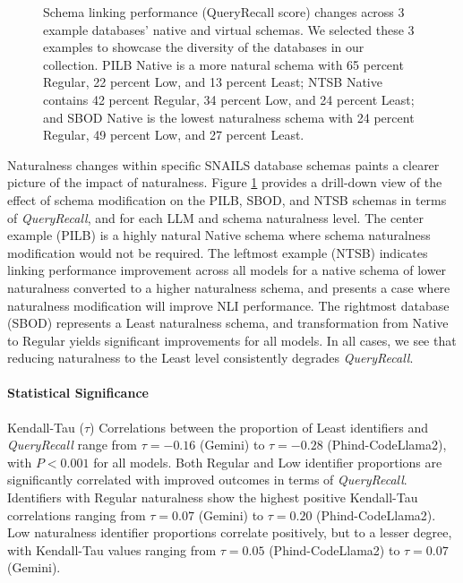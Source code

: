 \begin{figure}
\begin{subfigure}{\figwidthmod\linewidth}
  \end{subfigure}
  \caption{Schema linking performance (QueryRecall score) changes across 3 example databases' native and virtual schemas. We selected these 3 examples to showcase the diversity of the databases in our collection. PILB Native is a more natural schema with 65 percent Regular, 22 percent Low, and 13 percent Least; NTSB Native contains 42 percent Regular, 34 percent Low, and 24 percent Least; and SBOD Native is the lowest naturalness schema with 24 percent Regular, 49 percent Low, and 27 percent Least.}
  \label{fig:recall-boxplot-dbs}
\end{figure}

Naturalness changes within specific SNAILS database schemas paints a clearer picture of the impact of naturalness.
Figure \ref{fig:recall-boxplot-dbs} provides a drill-down view of the effect of schema modification on the PILB, SBOD, and NTSB schemas in terms of \emph{QueryRecall}, and for each LLM and schema naturalness level.
The center example (PILB) is a highly natural Native schema where schema naturalness modification would not be required. The leftmost example (NTSB) indicates linking performance improvement across all models for a native schema of lower naturalness converted to a higher naturalness schema, and presents a case where naturalness modification will improve NLI performance. The rightmost database (SBOD) represents a Least naturalness schema, and transformation from Native to Regular yields significant improvements for all models. In all cases, we see that reducing naturalness to the Least level consistently degrades \emph{QueryRecall}. 

\paragraph{\textbf{Statistical Significance}}
Kendall-Tau ($\tau$) Correlations between the proportion of Least identifiers and \emph{QueryRecall} range from $\tau=-0.16$ (Gemini) to $\tau=-0.28$ (Phind-CodeLlama2), with $P < 0.001$ for all models.
Both Regular and Low identifier proportions are significantly correlated with improved outcomes in terms of \emph{QueryRecall}.
Identifiers with Regular naturalness show the highest positive Kendall-Tau correlations ranging from $\tau=0.07$ (Gemini) to $\tau=0.20$ (Phind-CodeLlama2).
Low naturalness identifier proportions correlate positively, but to a lesser degree, with Kendall-Tau values ranging from $\tau=0.05$ (Phind-CodeLlama2) to $\tau=0.07$ (Gemini).

